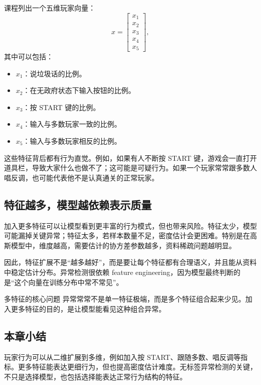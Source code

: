 \documentclass[a4paper]{article}
\begin{document}
课程列出一个五维玩家向量：
\[
x=
\begin{bmatrix}
x_1\\x_2\\x_3\\x_4\\x_5
\end{bmatrix},
\]
其中可以包括：
\begin{itemize}
    \item $x_1$：说垃圾话的比例。
    \item $x_2$：在无政府状态下输入按钮的比例。
    \item $x_3$：按 START 键的比例。
    \item $x_4$：输入与多数玩家一致的比例。
    \item $x_5$：输入与多数玩家相反的比例。
\end{itemize}

这些特征背后都有行为直觉。例如，如果有人不断按 START 键，游戏会一直打开道具栏，导致大家什么也做不了；这可能是可疑行为。如果一个玩家常常跟多数人唱反调，也可能代表他不是认真通关的正常玩家。

\subsection{特征越多，模型越依赖表示质量}

加入更多特征可以让模型看到更丰富的行为模式，但也带来风险。特征太少，模型可能漏掉关键异常；特征太多，若样本数量不足，密度估计会更困难。特别是在高斯模型中，维度越高，需要估计的协方差参数越多，资料稀疏问题越明显。

因此，特征扩展不是“越多越好”，而是要让每个特征都有合理语义，并且能从资料中稳定估计分布。异常检测很依赖 feature engineering，因为模型最终判断的是“这个向量在训练分布中常不常见”。

\begin{importantbox}{多特征的核心问题}
    异常常常不是单一特征极端，而是多个特征组合起来少见。加入更多特征的目的，是让模型能看见这种组合异常。
\end{importantbox}

\subsection{本章小结}

玩家行为可以从二维扩展到多维，例如加入按 START、跟随多数、唱反调等指标。更多特征能表达更细行为，但也提高密度估计难度。无标签异常检测的关键，不只是选择模型，也包括选择能表达正常行为结构的特征。

\end{document}
